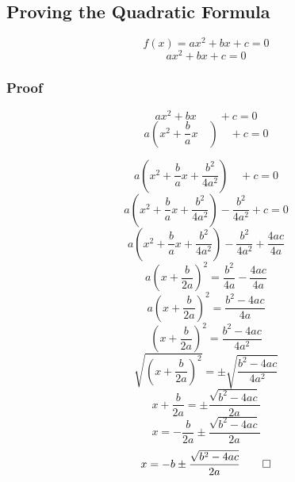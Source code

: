 \subsection{Proving the Quadratic Formula}
\begin{definition}[Quadratic]
  $$f(x) = ax^2 + bx + c = 0$$
  $$ax^2 + bx + c = 0$$
\end{definition}

\subsubsection{Proof}
$$ax^2 + bx \qquad + c = 0$$
$$a(x^2 + \frac{b}{a}x \quad) \quad + c = 0$$
\begin{center}
\end{center}
$$a(x^2 + \frac{b}{a}x + \frac{b^2}{4a^2}) \quad + c = 0$$
$$a(x^2 + \frac{b}{a}x + \frac{b^2}{4a^2}) - \frac{b^2}{4a^2} + c = 0$$
$$a(x^2 + \frac{b}{a}x + \frac{b^2}{4a^2}) - \frac{b^2}{4a^2} + \frac{4ac}{4a}$$
$$a(x + \frac{b}{2a})^2 = \frac{b^2}{4a} - \frac{4ac}{4a}$$
$$a(x + \frac{b}{2a})^2 = \frac{b^2 - 4ac}{4a}$$
$$(x + \frac{b}{2a})^2 = \frac{b^2 - 4ac}{4a^2}$$
$$\sqrt{(x + \frac{b}{2a})^2} = \pm \sqrt{\frac{b^2 - 4ac}{4a^2}}$$
$$x + \frac{b}{2a} = \pm \frac{\sqrt{b^2 - 4ac}}{2a}$$
$$x = - \frac{b}{2a} \pm \frac{\sqrt{b^2 - 4ac}}{2a}$$
$$x = -b \pm \frac{\sqrt{b^2 - 4ac}}{2a} \qed $$
